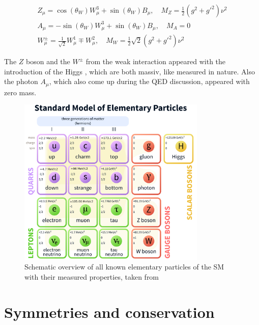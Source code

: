 \begin{equation}
	\label{eq:eq_1_10}
	\begin{split}
		Z_{\mu} = \cos(\theta_{W})W^{3}_{\mu} + \sin(\theta_{W})B_{\mu}, \quad M_{Z} = \frac{1}{2}(g^2 + g'^2)\nu^2 \\
		A_{\mu} = -\sin(\theta_{W})W^{3}_{\mu} + \sin(\theta_{W})B_{\mu}, \quad M_{A} = 0 \\
		W^{\pm}_{\mu} = \frac{1}{\sqrt{2}}W^{1}_{\mu} \mp W^{2}_{\mu}, \quad M_{W} = \frac{1}2{\sqrt{2}}(g^2+g'^2)\nu^2
	\end{split}
\end{equation}

The $Z$ boson and the $W^{\pm}$ from the weak interaction appeared with the introduction of the Higgs \cite{HIGGDISCOVER}, which are both massiv, like measured in nature. Also the photon $A_{\mu}$, which also come up during the \gls{QED} discussion, appeared with zero mass. 


\begin{figure}[hpt]
	\centering
	\includegraphics[width=0.8\textwidth]{pictures/Standard_Model_of_Elementary_Particles.pdf}

	\caption[Schematic overwiev of Standard Model particles]{Schematic overview of all known elementary particles of the \gls{SM} with their measured properties, taken from \cite{SMPARTICLES}}
	\label{fig:fig_1_1}
\end{figure}

\section{Symmetries and conservation}
\label{sec:section_1_2}

